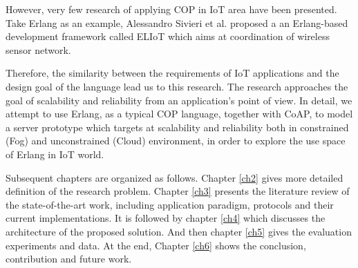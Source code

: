 However, very few research of applying COP in IoT area have been presented. Take Erlang as an example, Alessandro Sivieri et al. \cite{Sivieri:2012:DPT:2667049.2667051} proposed a an Erlang-based development framework called ELIoT which aims at coordination of wireless sensor network. 

Therefore, the similarity between the requirements of IoT applications and the design goal of the language lead us to this research. The research approaches the goal of scalability and reliability from an application's point of view. In detail, we attempt to use Erlang, as a typical COP language, together with CoAP, to model a server prototype which targets at scalability and reliability both in constrained (Fog) and unconstrained (Cloud) environment, in order to explore the use space of Erlang in IoT world. 

Subsequent chapters are organized as follows. Chapter \ref{ch2} gives more detailed definition of the research problem. Chapter \ref{ch3} presents the literature review of the state-of-the-art work, including application paradigm, protocols and their current implementations. It is followed by chapter \ref{ch4} which discusses the architecture of the proposed solution. And then chapter \ref{ch5} gives the evaluation experiments and data. At the end, Chapter \ref{ch6} shows the conclusion, contribution and future work.